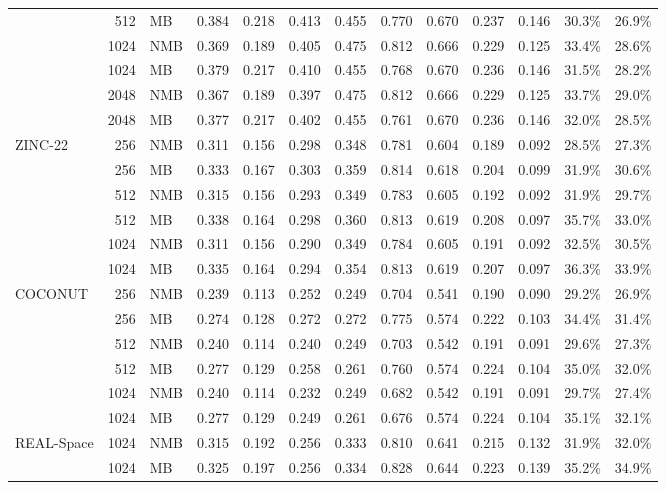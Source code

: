 \begin{table}[htbp]
{\begin{tabular}{@{}l r l r r r r r r r r r r@{}}
     & 512 & MB & 0.384 & 0.218 & 0.413 & 0.455 & 0.770 & 0.670 & 0.237 & 0.146 & 30.3\% & 26.9\% \\
     & 1024 & NMB & 0.369 & 0.189 & 0.405 & 0.475 & 0.812 & 0.666 & 0.229 & 0.125 & 33.4\% & 28.6\% \\
     & 1024 & MB & 0.379 & 0.217 & 0.410 & 0.455 & 0.768 & 0.670 & 0.236 & 0.146 & 31.5\% & 28.2\% \\
     & 2048 & NMB & 0.367 & 0.189 & 0.397 & 0.475 & 0.812 & 0.666 & 0.229 & 0.125 & 33.7\% & 29.0\% \\
     & 2048 & MB & 0.377 & 0.217 & 0.402 & 0.455 & 0.761 & 0.670 & 0.236 & 0.146 & 32.0\% & 28.5\% \\
    \addlinespace
    ZINC-22 & 256 & NMB & 0.311 & 0.156 & 0.298 & 0.348 & 0.781 & 0.604 & 0.189 & 0.092 & 28.5\% & 27.3\% \\
     & 256 & MB & 0.333 & 0.167 & 0.303 & 0.359 & 0.814 & 0.618 & 0.204 & 0.099 & 31.9\% & 30.6\% \\
     & 512 & NMB & 0.315 & 0.156 & 0.293 & 0.349 & 0.783 & 0.605 & 0.192 & 0.092 & 31.9\% & 29.7\% \\
     & 512 & MB & 0.338 & 0.164 & 0.298 & 0.360 & 0.813 & 0.619 & 0.208 & 0.097 & 35.7\% & 33.0\% \\
     & 1024 & NMB & 0.311 & 0.156 & 0.290 & 0.349 & 0.784 & 0.605 & 0.191 & 0.092 & 32.5\% & 30.5\% \\
     & 1024 & MB & 0.335 & 0.164 & 0.294 & 0.354 & 0.813 & 0.619 & 0.207 & 0.097 & 36.3\% & 33.9\% \\
    \addlinespace
    COCONUT & 256 & NMB & 0.239 & 0.113 & 0.252 & 0.249 & 0.704 & 0.541 & 0.190 & 0.090 & 29.2\% & 26.9\% \\
     & 256 & MB & 0.274 & 0.128 & 0.272 & 0.272 & 0.775 & 0.574 & 0.222 & 0.103 & 34.4\% & 31.4\% \\
     & 512 & NMB & 0.240 & 0.114 & 0.240 & 0.249 & 0.703 & 0.542 & 0.191 & 0.091 & 29.6\% & 27.3\% \\
     & 512 & MB & 0.277 & 0.129 & 0.258 & 0.261 & 0.760 & 0.574 & 0.224 & 0.104 & 35.0\% & 32.0\% \\
     & 1024 & NMB & 0.240 & 0.114 & 0.232 & 0.249 & 0.682 & 0.542 & 0.191 & 0.091 & 29.7\% & 27.4\% \\
     & 1024 & MB & 0.277 & 0.129 & 0.249 & 0.261 & 0.676 & 0.574 & 0.224 & 0.104 & 35.1\% & 32.1\% \\
    \addlinespace
    REAL-Space & 1024 & NMB & 0.315 & 0.192 & 0.256 & 0.333 & 0.810 & 0.641 & 0.215 & 0.132 & 31.9\% & 32.0\% \\
     & 1024 & MB & 0.325 & 0.197 & 0.256 & 0.334 & 0.828 & 0.644 & 0.223 & 0.139 & 35.2\% & 34.9\% \\
    \bottomrule
  \end{tabular}%
  }
\end{table}
